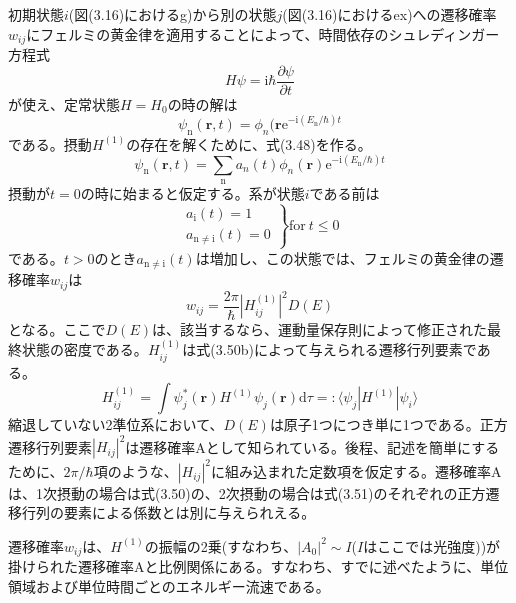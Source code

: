\documentclass[11pt,a4j,uplatex]{jsarticle}
\begin{document}
初期状態$i$(図(3.16)におけるg)から別の状態$j$(図(3.16)におけるex)への遷移確率$w_{ij}$にフェルミの黄金律を適用することによって、時間依存のシュレディンガー方程式
\begin{equation}
  H\psi=\mathrm{i}\hbar\frac{\partial\psi}{\partial t}\tag{3.47a}
\end{equation}
が使え、定常状態$H=H_0$の時の解は
\begin{equation}
  \psi_{\mathrm{n}}(\bm{r},t)=\phi_{n}(\bm{r}\mathrm{e}^{-\mathrm{i}(E_{\mathrm{n}}/\hbar)t}\tag{3.47b}
\end{equation}
である。摂動$H^{(1)}$の存在を解くために、式(3.48)を作る。
\begin{equation}
  \psi_{\mathrm{n}}(\bm{r},t)=\sum_{\mathrm{n}}a_{n}(t)\phi_{n}(\bm{r})\mathrm{e}^{-\mathrm{i}(E_{\mathrm{n}}/\hbar)t}\tag{3.48}
\end{equation}
摂動が$t=0$の時に始まると仮定する。系が状態$i$である前は
\begin{equation}
\left.
\begin{array}{ccc}
a_{\mathrm{i}}(t)=1\\
a_{\mathrm{n\not=i}}(t)=0
\end{array}
\right\}  \mathrm{for}\:t\leq0\tag{3.49}
\end{equation}
である。$t>0$のとき$a_{\mathrm{n\not=i}}(t)$は増加し、この状態では、フェルミの黄金律の遷移確率$w_{ij}$は
\begin{equation}
  w_{ij}=\frac{2\pi}{\hbar}\left|H_{ij}^{(1)}\right|^2D(E)\tag{3.50a}
\end{equation}
となる。ここで$D(E)$は、該当するなら、運動量保存則によって修正された最終状態の密度である。$H_{ij}^{(1)}$は式(3.50b)によって与えられる遷移行列要素である。
\begin{equation}
  H_{ij}^{(1)}=\int\psi_j^*(\bm{r})H^{(1)}\psi_j(\bm{r})\mathrm{d}\tau=:\langle\psi_j\left|H^{(1)}\right|\psi_i\rangle\tag{3.50b}
\end{equation}
縮退していない2準位系において、$D(E)$は原子1つにつき単に1つである。正方遷移行列要素$\left|H_{ij}\right|^2$は遷移確率Aとして知られている。後程、記述を簡単にするために、$2\pi/\hbar$項のような、$\left|H_{ij}\right|^2$に組み込まれた定数項を仮定する。遷移確率Aは、1次摂動の場合は式(3.50)の、2次摂動の場合は式(3.51)のそれぞれの正方遷移行列の要素による係数とは別に与えられえる。

遷移確率$w_{ij}$は、$H^{(1)}$の振幅の2乗(すなわち、$\left|A_0\right|^2\sim I$($I$はここでは光強度))が掛けられた遷移確率Aと比例関係にある。すなわち、すでに述べたように、単位領域および単位時間ごとのエネルギー流速である。%
\end{document}
